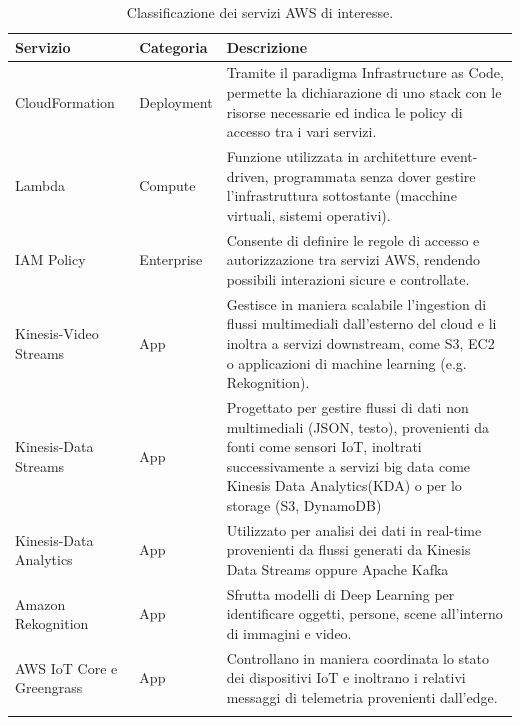 \begin{longtable}{@{}p{3cm}p{2.5cm}p{7cm}@{}}
\toprule
\textbf{Servizio} & \textbf{Categoria} & \textbf{Descrizione} \\ \midrule
\endfirsthead

\endhead

CloudFormation & Deployment & Tramite il paradigma Infrastructure as Code, permette la dichiarazione di uno stack con le risorse necessarie ed indica le policy di accesso tra i vari servizi. \\ \midrule
Lambda & Compute & Funzione utilizzata in architetture event-driven, programmata senza dover gestire l'infrastruttura sottostante (macchine virtuali, sistemi operativi). \\ \midrule
IAM Policy & Enterprise & Consente di definire le regole di accesso e autorizzazione tra servizi AWS, rendendo possibili interazioni sicure e controllate. \\ \midrule
Kinesis-Video Streams & App & Gestisce in maniera scalabile l'ingestion di flussi multimediali dall'esterno del cloud e li inoltra a servizi downstream, come S3, EC2 o applicazioni di machine learning (e.g. Rekognition). \\ \midrule
Kinesis-Data Streams & App & Progettato per gestire flussi di dati non multimediali (JSON, testo), provenienti da fonti come sensori IoT, inoltrati successivamente a servizi big data come Kinesis Data Analytics(KDA) o per lo storage (S3, DynamoDB) \\ \midrule   
Kinesis-Data Analytics & App & Utilizzato per analisi dei dati in real-time provenienti da flussi generati da Kinesis Data Streams oppure Apache Kafka \\ \midrule
Amazon Rekognition & App & Sfrutta modelli di Deep Learning per identificare oggetti, persone, scene all'interno di immagini e video. \\ \midrule
AWS IoT Core e Greengrass & App & Controllano in maniera coordinata lo stato dei dispositivi IoT e inoltrano i relativi messaggi di telemetria provenienti dall'edge. \\ \bottomrule
\caption{Classificazione dei servizi AWS di interesse.} \label{tab:aws_services}
\end{longtable}

